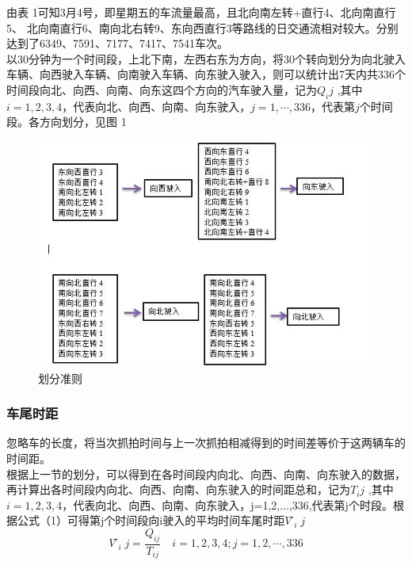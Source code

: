 \documentclass[UTF8]{article}
\begin{document}
    由表 1可知3月4号，即星期五的车流量最高，且北向南左转+直行4、北向南直行5、
    北向南直行6、南向北右转9、东向西直行3等路线的日交通流相对较大。分别达到了6349、7591、7177、7417、7541车次。\\
    以30分钟为一个时间段，上北下南，左西右东为方向，将30个转向划分为向北驶入车辆、向西驶入车辆、向南驶入车辆、向东驶入驶入，则可以统计出7天内共336个时间段向北、向西、向南、向东这四个方向的汽车驶入量，记为$Q_ij$  ,其中$i=1,2,3,4$，代表向北、向西、向南、向东驶入，$j=1,⋯,336$，代表第$j$个时间段。各方向划分，见图 1\\
    \begin{figure}[H]
        \includegraphics[width=\linewidth]{1.jpg}
        \caption{划分准则}
        \label{fig:ph1}
    \end{figure}
    \subsubsection{车尾时距}
        忽略车的长度，将当次抓拍时间与上一次抓拍相减得到的时间差等价于这两辆车的时间距。\\
    根据上一节的划分，可以得到在各时间段内向北、向西、向南、向东驶入的数据，再计算出各时间段内向北、向西、向南、向东驶入的时间距总和，记为$T_ij$  ,其中$i=1,2,3,4$，代表向北、向西、向南、向东驶入，j=1,2,...,336,代表第j个时段。根据公式（1）可得第j个时间段向i驶入的平均时间车尾时距$V ̃_ij$\\
    \begin{equation}
        V ̃_ij=\frac{Q_{ij}}{T_{ij}} \quad i=1,2,3,4; j=1,2,⋯,336	
    \end{equation}
        
\end{document}
